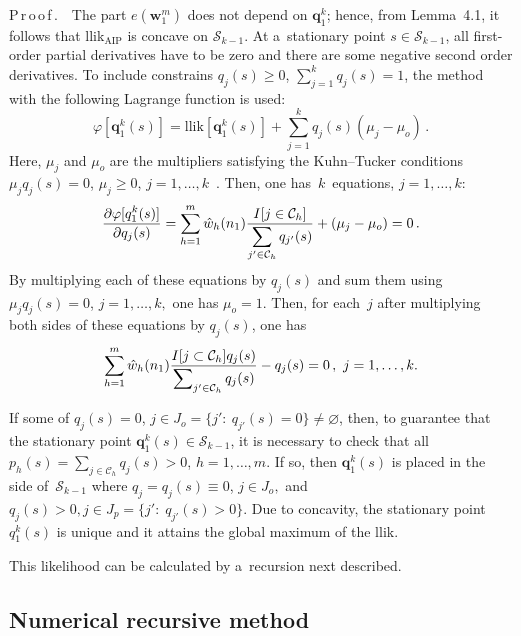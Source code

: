 \begin{multicols}{2}

\noindent
{P\,r\,o\,o\,f\,.}\ \
 The part $e(\mathbf{w}_1^m)$ does not depend on $\mathbf{q}_1^k$; 
 hence, from Lemma~4.1, it follows
 that llik$_{\mathrm{AIP}}$ is concave on $\mathcal{S}_{k-1}.$
At a~stationary point $s\in\mathcal{S}_{k-1}$, all first-order partial derivatives
have to be zero and there are some negative second order derivatives.
To include constrains  $q_j (s)\ge 0$, $\sum_{j=1}^k q_j(s) =1$, 
the method with the following Lagrange function is used:
$$
\varphi \left[\mathbf{q}_1^k (s)\right] =\mathrm{llik}
\left [\mathbf{q}_1^k(s)\right] +\sum_{j=1}^k q_j(s) \left(\mu_j -\mu_o\right)\,.
$$
Here, $\mu_j$ and $\mu_o$ are the
multipliers satisfying the Kuhn--Tucker conditions $\mu_jq_j (s)=0$, 
$\mu_j\ge 0$, $j=1, \ldots , k$~\cite{BK:GG94, BK:BT05}. Then,
one has~$k$~equations, $j=1, \ldots, k$:
\begin{equation*}
 \displaystyle\frac{\displaystyle \partial \varphi [q_1^k(s)]\mathstrut}{\displaystyle \partial q_j(s)\mathstrut} =
\sum\limits_{h=1}^m \hat w_h (n_1) \displaystyle\frac{\displaystyle I[j\in \mathcal{C}_h]\mathstrut}{\displaystyle \sum\limits_{j'\in \mathcal{C}_h} q_{j'}(s)\mathstrut}
+ (\mu_j -\mu_o) =0\,.
\end{equation*}
By multiplying each of these equations by $q_j(s)$ and sum them using 
$\mu_j q_j (s)=0$, $j=1, \ldots, k,$ one has $\mu_o =1$.
Then, for each~$j$ after multiplying both sides of these equations by $q_j(s)$,
one has
$$
\sum\limits_{h=1}^m \hat{w}_h (n_1) \fr{I[j\subset \mathcal{C}_h] q_j(s)}
{\sum\nolimits_{j'\in\mathcal{C}_h} q_j(s)} -q_j (s) =0\,,\ 
j=1, \ldots, k.
$$

If some of $q_j(s)=0$, $j\in J_o=\{ j':\ q_{j'} (s)=0\}$\linebreak $\not= \varnothing$, then,
 to guarantee that the stationary point $\mathbf{q}_1^k(s)\in\mathcal{S}_{k-1}$,
 it is necessary to check that all
$p_h(s) =\sum_{j\in\mathcal{C}_h} q_j(s) >0$, $h=1, \ldots, m.$
If so, then $\mathbf{q}_1^k(s)$ is placed in the side 
of~$\mathcal{S}_{k-1}$ where $q_j =q_j (s)\equiv 0$, $j\in J_o,$
and $q_j(s)>0, j\in J_p=\{ j':\; q_{j'} (s) >0\}.$
Due to concavity, the stationary point $q_1^k (s)$ is unique and it attains 
the global maximum of the llik.

\smallskip

  This likelihood can be calculated by a~recursion next described.

\subsection{Numerical recursive method}


\end{multicols}
